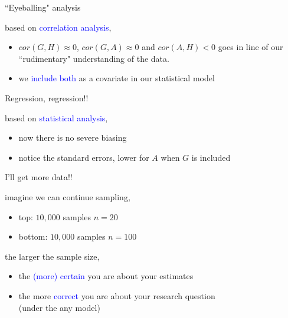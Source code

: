 %
%
\begin{lhframe}[rhgraphic={\texttt{[image: fork3\_panel.pdf]}}]
	{``Eyeballing" analysis}
	
	based on \textcolor{blue}{correlation analysis},
	\begin{itemize}
		\item $cor(G, H) \approx 0$, $cor(G, A) \approx 0$ and $cor(A, H) < 0$ goes in line of our ``rudimentary" understanding of the data.
		\item we \textcolor{blue}{include both} as a covariate in our statistical model
	\end{itemize}
\end{lhframe}
%
%
\begin{lhframe}[rhgraphic={\texttt{[image: fork3\_reg.png]}}]
	{Regression, regression!!}
	
	based on \textcolor{blue}{statistical analysis},
	\begin{itemize}
		\item now there is no severe biasing
		\item notice the standard errors, lower for $A$ when $G$ is included
	\end{itemize}
\end{lhframe}
%
%
\begin{lhframe}[rhgraphic={\texttt{[image: fork3\_samplesize.pdf]}}]
	{I'll get more data!!}
	
	imagine we can continue sampling,
	\begin{itemize}
		\item top: $10,000$ samples $n=20$
		\item bottom: $10,000$ samples $n=100$
	\end{itemize}
	
	the larger the sample size,
	\begin{itemize}
		\item the \textcolor{blue}{(more) certain} you are about your estimates
		\item the more \textcolor{blue}{correct} you are about your research question \\
		{\small (under the any model)}
	\end{itemize}
\end{lhframe}
%
%
